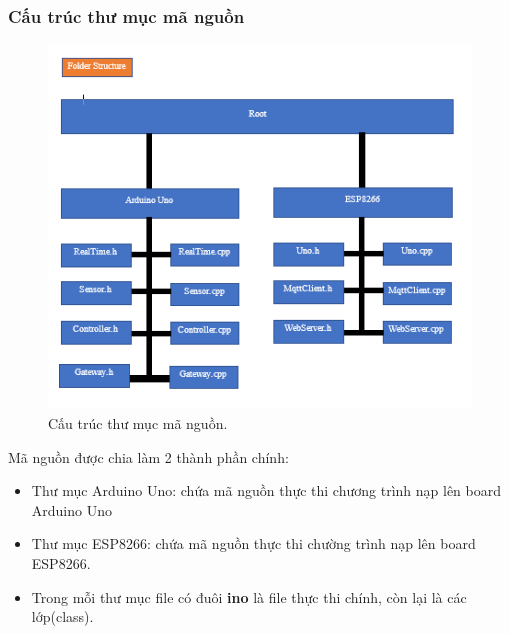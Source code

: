 \documentclass[a4paper,12pt,oneside]{article}
\begin{document}
\subsubsection{Cấu trúc thư mục mã nguồn}
\begin{figure}[H]
\begin{center}
\includegraphics[scale=0.9]{hinh/structure.png}
\end{center}
\caption{Cấu trúc thư mục mã nguồn.}
\end{figure}
Mã nguồn được chia làm 2 thành phần chính:
\begin{itemize}
\item Thư mục Arduino Uno: chứa mã nguồn thực thi chương trình nạp lên board Arduino Uno
\item Thư mục ESP8266: chứa mã nguồn thực thi chường trình nạp lên board ESP8266.
\item Trong mỗi thư mục file có đuôi \textbf{ino} là file thực thi chính, còn lại là các lớp(class).
\end{itemize}
\end{document}
